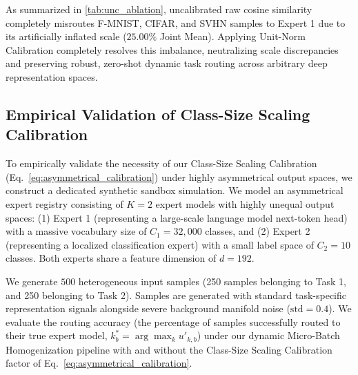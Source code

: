 As summarized in \cref{tab:unc_ablation}, uncalibrated raw cosine similarity completely misroutes F-MNIST, CIFAR, and SVHN samples to Expert 1 due to its artificially inflated scale ($25.00\%$ Joint Mean). Applying Unit-Norm Calibration completely resolves this imbalance, neutralizing scale discrepancies and preserving robust, zero-shot dynamic task routing across arbitrary deep representation spaces.

\subsection{Empirical Validation of Class-Size Scaling Calibration}
To empirically validate the necessity of our Class-Size Scaling Calibration (Eq.~\ref{eq:asymmetrical_calibration}) under highly asymmetrical output spaces, we construct a dedicated synthetic sandbox simulation. We model an asymmetrical expert registry consisting of $K=2$ expert models with highly unequal output spaces:
(1) Expert 1 (representing a large-scale language model next-token head) with a massive vocabulary size of $C_1 = 32,000$ classes, and
(2) Expert 2 (representing a localized classification expert) with a small label space of $C_2 = 10$ classes. Both experts share a feature dimension of $d = 192$.

We generate $500$ heterogeneous input samples (250 samples belonging to Task 1, and 250 belonging to Task 2). Samples are generated with standard task-specific representation signals alongside severe background manifold noise ($\text{std} = 0.4$). We evaluate the routing accuracy (the percentage of samples successfully routed to their true expert model, $k_b^* = \arg\max_k u'_{k,b}$) under our dynamic Micro-Batch Homogenization pipeline with and without the Class-Size Scaling Calibration factor of Eq.~\ref{eq:asymmetrical_calibration}.

